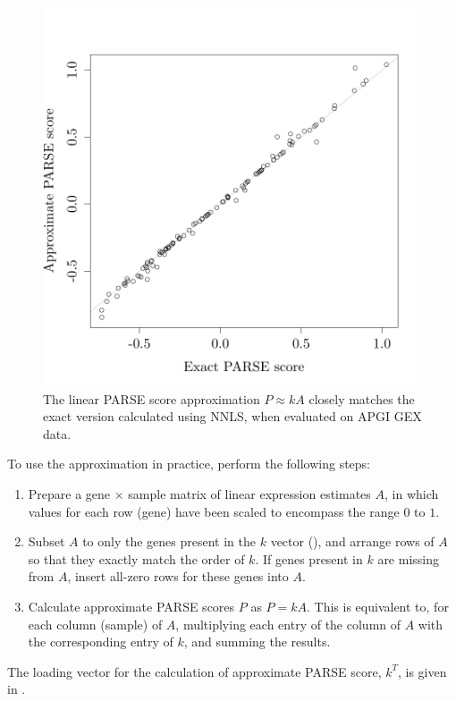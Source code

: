 \begin{figure}[!htbp]
\centering
\includegraphics[width=.7\linewidth]{analysis/biosurv/reports/18_SIS_diag_dsd_final/figure/approx-calc-1}
\caption[Performance of the \texorpdfstring{\acrshort{PARSE}}{PARSE} score approximation]{The linear \acrshort{PARSE} score approximation $P \approx k A$ closely matches the exact version calculated using \gls{NNLS}, when evaluated on \gls{APGI} \gls{GEX} data.}\label{fig:app-parse-approx-matching}
\end{figure}

To use the approximation in practice, perform the following steps:
\begin{enumerate}
  \item Prepare a gene $\times$ sample matrix of linear expression estimates $A$, in which values for each row (gene) have been scaled to encompass the range $0$ to $1$.
  \item Subset $A$ to only the genes present in the $k$ vector (), and arrange rows of $A$ so that they exactly match the order of $k$.  If genes present in $k$ are missing from $A$, insert all-zero rows for these genes into $A$.
  \item Calculate approximate \gls{PARSE} scores $P$ as $P = k A$.  This is equivalent to, for each column (sample) of $A$, multiplying each entry of the column of $A$ with the corresponding entry of $k$, and summing the results.
\end{enumerate}

The loading vector for the calculation of approximate \gls{PARSE} score, $k^T$, is given in .

